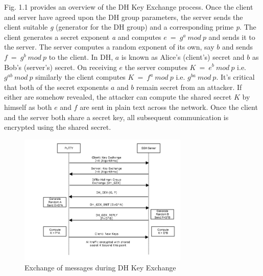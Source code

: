 \documentclass{bhamthesis}
\begin{document}
Fig. 1.1 provides an overview of the DH Key Exchange process. Once the client and server have agreed upon the DH group parameters, the server sends the client suitable \textit{g} (generator for the DH group) and a corresponding prime \textit{p}. The client generates a secret exponent \textit{a} and computes \(e\ = \ g^a\ mod\ p\) and sends it to the server. The server computes a random exponent of its own, say \(b\) and sends \(f\ =\ g^b\ mod\ p\) to the client. In DH, \(a\) is known as Alice's (client's) secret and \(b\) as Bob's (server's) secret. On receiving \(e\) the server computes \(K\ =\ e^b\ mod\ p\)  i.e. \(g^{ab} \ mod\ p\) similarly the client computes \(K\ =\ f^a\ mod\ p\) i.e. \(g^{ba}\ mod\ p\). It's critical that both of the secret exponents \(a\) and \(b\) remain secret from an attacker. If either are somehow revealed, the attacker can compute the shared secret \(K\) by himself as both \(e\) and \(f\) are sent in plain text across the network. Once the client and the server both share a secret key, all subsequent communication is encrypted using the shared secret.
\begin{figure}[ht]
\caption{Exchange of messages during DH Key Exchange}
\centering
\includegraphics[width=0.72\textwidth]{SSH_DH_KEX.png}
\end{figure}
\end{document}
